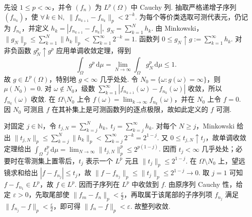 \begin{FAProof}
先设 \(\displaystyle 1\leqslant p<\infty\)，并令 \(\displaystyle (f_n)\) 为 \(\displaystyle L^p(\Omega)\) 中 Cauchy 列. 抽取严格递增子序列 \(\displaystyle (f_{n_k})\)，使 \(\displaystyle \forall\,k\in\mathbb N,\; \|f_{n_{k+1}}-f_{n_k}\|_p<2^{-k}\).
为每个等价类选取可测代表元，仍记为 \(\displaystyle f_{n_k}\)，并定义 \(\displaystyle h_k=|f_{n_{k+1}}-f_{n_k}|, \; g_N=\sum_{k=1}^{N}h_k\).
由 Minkowski， \(\displaystyle \|g_N\|_p \leqslant\sum_{k=1}^{N}\|h_k\|_p <\sum_{k=1}^{\infty}2^{-k}=1\).
函数列 \(\displaystyle 0\leqslant g_N\uparrow g:=\sum_{k=1}^{\infty}h_k\). 对非负函数 \(\displaystyle g_N^p\uparrow g^p\) 应用单调收敛定理，得到
\[
\int_\Omega g^p\,\mathrm{d}\mu
=\lim_{N\to\infty}\int_\Omega g_N^p\,\mathrm{d}\mu
\leqslant1.
\]
故 \(\displaystyle g\in L^p(\Omega)\)，特别地 \(\displaystyle g<\infty\) 几乎处处. 令 \(\displaystyle N_0=\{\omega:g(\omega)=\infty\}\)，则 \(\displaystyle \mu(N_0)=0\). 对 \(\displaystyle \omega\notin N_0\)，级数 \(\displaystyle \sum_{k=1}^{\infty}|f_{n_{k+1}}(\omega)-f_{n_k}(\omega)|\) 收敛，所以 \(\displaystyle f_{n_k}(\omega)\) 收敛. 在 \(\displaystyle \Omega\setminus N_0\) 上令 \(\displaystyle f(\omega)=\lim_{k\to\infty}f_{n_k}(\omega)\)，并在 \(\displaystyle N_0\) 上令 \(\displaystyle f=0\). 因 \(\displaystyle N_0\) 可测且 \(\displaystyle f\) 在其补集上是可测函数列的逐点极限，故如此定义的 \(\displaystyle f\) 可测.

对固定 \(\displaystyle j\in\mathbb N\)，令 \(\displaystyle t_{j,N}=\sum_{k=j}^{N}h_k, \; t_j=\sum_{k=j}^{\infty}h_k\).
对每个 \(\displaystyle N\geqslant j\)，Minkowski 给出 \(\displaystyle \|t_{j,N}\|_p\leqslant\sum_{k=j}^{N}\|h_k\|_p<\sum_{k=j}^{\infty}2^{-k}=2^{1-j}\). 又 \(\displaystyle 0\leqslant t_{j,N}\uparrow t_j\)，故单调收敛定理给出 \(\displaystyle \int_\Omega t_j^p\,\mathrm{d}\mu=\lim_{N\to\infty}\|t_{j,N}\|_p^p\leqslant2^{p(1-j)}\). 因而 \(\displaystyle t_j<\infty\) 几乎处处；必要时在零测集上置零后，\(\displaystyle t_j\) 表示一个 \(\displaystyle L^p\) 元且 \(\displaystyle \|t_j\|_p\leqslant2^{1-j}\). 在 \(\displaystyle \Omega\setminus N_0\) 上，望远镜求和给出 \(\displaystyle |f-f_{n_j}|\leqslant t_j\)，故
\(\displaystyle \|f-f_{n_j}\|_p\leqslant\|t_j\|_p\leqslant2^{1-j}\to0\).
取 \(\displaystyle j=1\) 可知 \(\displaystyle f-f_{n_1}\in L^p\)，故 \(\displaystyle f\in L^p\). 因而子序列在 \(\displaystyle L^p\) 中收敛到 \(\displaystyle f\). 由原序列 Cauchy 性，给定 \(\displaystyle \varepsilon>0\)，先取尾部使 \(\displaystyle \|f_m-f_n\|_p<\frac{\varepsilon}{2}\)，再取属于该尾部的子序列项 \(\displaystyle f_{n_j}\) 满足 \(\displaystyle \|f_{n_j}-f\|_p<\frac{\varepsilon}{2}\)，即可得 \(\displaystyle \|f_n-f\|_p<\varepsilon\). 故整列收敛.


\end{FAProof}
